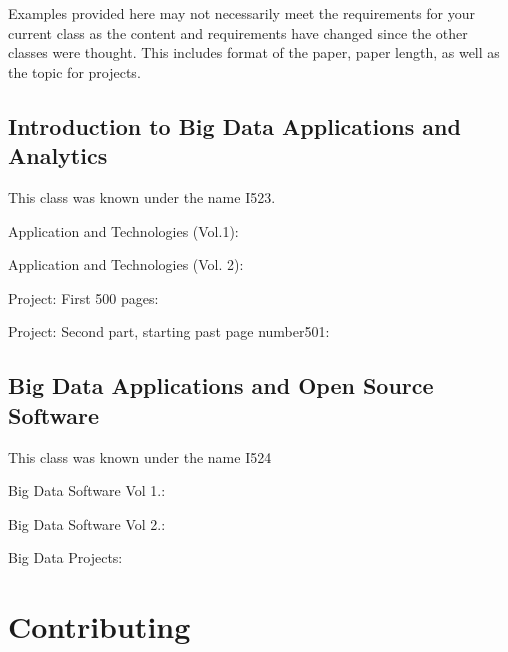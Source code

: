 \begin{NOTE}
  Examples provided here may not necessarily meet the requirements for
  your current class as the content and requirements have changed
  since the other classes were thought. This includes format of the
  paper, paper length, as well as the topic for projects.
\end{NOTE}

\subsection{Introduction to Big Data Applications and Analytics}

This class was known under the name I523.


Application and Technologies (Vol.1):

Application and Technologies (Vol. 2):

Project: First 500 pages:

Project: Second part, starting past page number501:

\subsection{Big Data Applications and Open Source Software}

This class was known under the name I524

Big Data Software Vol 1.:

Big Data Software Vol 2.:

Big Data Projects:


\section{Contributing}

